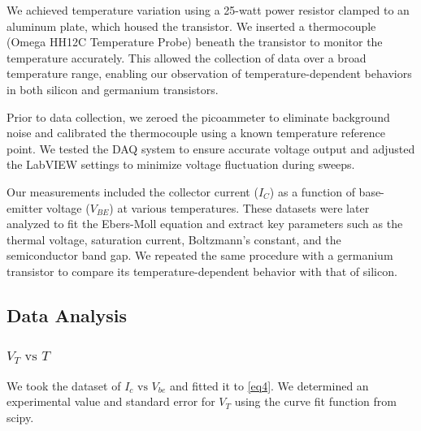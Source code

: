 \documentclass[12pt,letterpaper,twocolumn]{article}
\begin{document}
We achieved temperature variation using a 25-watt power resistor clamped to an aluminum plate, which housed the transistor. We inserted a thermocouple (Omega HH12C Temperature Probe) beneath the transistor to monitor the temperature accurately. This allowed the collection of data over a broad temperature range, enabling our observation of temperature-dependent behaviors in both silicon and germanium transistors.

Prior to data collection, we zeroed the picoammeter to eliminate background noise and calibrated the thermocouple using a known temperature reference point. We tested the DAQ system to ensure accurate voltage output and adjusted the LabVIEW settings to minimize voltage fluctuation during sweeps.

Our measurements included the collector current (\( I_C \)) as a function of base-emitter voltage (\( V_{BE} \)) at various temperatures. These datasets were later analyzed to fit the Ebers-Moll equation and extract key parameters such as the thermal voltage, saturation current, Boltzmann’s constant, and the semiconductor band gap. We repeated the same procedure with a germanium transistor to compare its temperature-dependent behavior with that of silicon.


\subsection{Data Analysis}
\subsubsection{$V_T \text{ vs } T$}
We took the dataset of $I_c \text{ vs }V_{be}$ and fitted it to \ref{eq4}. We determined an experimental value and standard error for $V_T$ using the curve fit function from scipy.
\end{document}
